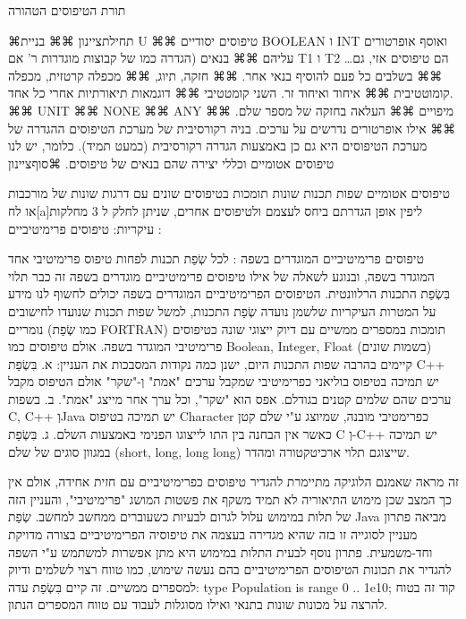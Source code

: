       תורת הטיפוסים הטהורה

      ⌘תחילת{ציינון}
      ⌘⌘ בניית U
      ⌘⌘ טיפוסים יסודיים BOOLEAN ו INT ואוסף אופרטורים עליהם
      ⌘⌘ בנאים (הגדרה כמו של קבוצות מוגדרות ר' אם T1 ו T2 הם טיפוסים אזי, גם…
      ⌘⌘ בשלבים כל פעם להוסיף בנאי אחר.
      ⌘⌘ חזקה, תיוג,
      ⌘⌘ מכפלה קרטזית, מכפלה קומוטטיבית
      ⌘⌘ איחוד ואיחוד זר. השני קומטטיבי
      ⌘⌘ דוגמאות תיאורתיות אחרי כל אחד.
      ⌘⌘ UNIT
      ⌘⌘ NONE
      ⌘⌘ ANY
      ⌘⌘ מיפויים
      ⌘⌘ העלאה בחזקה של מספר שלם.
      ⌘⌘ אילו אופרטורים נדרשים על ערכים.
      בניה רקורסיבית של מערכת הטיפוסים
      ההגדרה של מערכת הטיפוסים היא גם כן באמצעות הגדרה רקורסיבית (כמעט תמיד). כלומר, יש לנו טיפוסים אטומיים וכללי יצירה שהם בנאים של טיפוסים.
  ⌘סוף{ציינון}

      טיפוסים אטומיים
      שפות תכנות שונות תומכות בטיפוסים שונים עם דרגות שונות של מורכבות או לח[a]ליפין אופן הגדרתם ביחס לעצמם ולטיפוסים אחרים, שניתן לחלק ל 3 מחלקות עיקריות:
      טיפוסים פרימיטיביים :

      טיפוסים פרימיטיביים המוגדרים בשפה :
      לכל שְׂפַת תכנות לפחות טיפוס פרימיטיבי אחד המוגדר בשפה, ובנוגע לשאלה של אילו טיפוסים פרימיטיביים מוגדרים בשפה זה כבר תלוי בִּשְׂפַת התכנות הרלוונטית. הטיפוסים הפרימיטיביים המוגדרים בשפה יכולים לחשוף לנו מידע על המטרות העיקריות שלשמן נועדה שְׂפַת התכנות, למשל שפות תכנות שנועדו לחישובים נומריים (כמו שְׂפַת FORTRAN) תומכות במספרים ממשיים עם דיוק ייצוגי שונה כטיפוסים פרימיטיבי המוגדר בשפה.
      אולם טיפוסים כמו Boolean, Integer, Float (בשמות שונים) קיימים בהרבה שפות התכנות היום, ישנן כמה נקודות המסבכות את העניין:
      א. בִּשְׂפַת C++ יש תמיכה בטיפוס בוליאני כפרימיטיבי שמקבל ערכים "אמת" וְ-"שקר" אולם הטיפוס מקבל ערכים שהם שלמים קטנים בגודלם. אפס הוא "שקר", וכל ערך אחר מייצג "אמת".
      ב. בשפות C, C++ וְJava יש תמיכה בטיפוס Character כפרימטיבי מובנה, שמיוצג ע"י שלם קטן כאשר אין הבחנה בין התו לייצוגו הפנימי באמצעות השלם.
      ג. בִּשְׂפַת C וְ-C++ יש תמיכה במגוון סוגים של שלם (short, long, long long) שייצוגם תלוי ארכיטקטורה ומהדר.

      זה מראה שאמנם הלוגיקה מתיימרת להגדיר טיפוסים כפרימיטיביים עם חזית אחידה, אולם אין כך המצב שכן מימוש התיאוריה לא תמיד משקף את פשטות המושג "פרימיטיבי", והעניין הזה של תלות במימוש עלול לגרום לבעיות כשעוברים ממחשב למחשב. שְׂפַת Java מביאה פתרון מעניין לסוגייה זו בזה שהיא מגדירה בעצמה את טיפוסיה הפרימיטיביים בצורה מדויקת וחד-משמעית. פתרון נוסף לבעית התלות במימוש היא מתן אפשרות למשתמש ע"י השפה להגדיר את תכונות הטיפוסים הפרימיטיביים בהם נעשה שימוש, כמו טווח רצוי לשלמים ודיוק למספרים ממשיים. זה קיים בִּשְׂפַת עדה:
      type Population is range 0 .. 1e10;
      קוד זה בטוח להרצה על מכונות שונות בתנאי ואילו מסוגלות לעבוד עם טווח המספרים הנתון.

